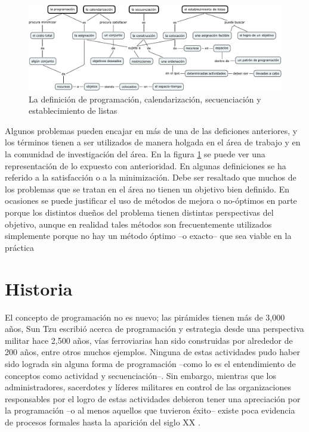 \documentclass[spanish,draft,12pt,headsepline,footsepline,paper=letter]{scrreprt}
\begin{document}
\begin{figure}[hbtp]
\includegraphics[width=\textwidth]{media/definiciones.pdf}
\caption[Definiciones]{La definición de programación, calendarización, secuenciación y establecimiento de listas}
\label{fig:definitions}
\end{figure}

Algunos problemas pueden encajar en más de una de las deficiones anteriores, y los términos tienen a ser utilizados de manera holgada en el área de trabajo y en la comunidad de investigación del área. En la figura \ref{fig:definitions} se puede ver una representación de lo expuesto con anterioridad.
%
En algunas definiciones se ha referido a la satisfacción o a la minimización. Debe ser resaltado que muchos de los problemas que se tratan en el área no tienen un objetivo bien definido. En ocasiones se puede justificar el uso de métodos de mejora o no-óptimos en parte porque los distintos dueños del problema tienen distintas perspectivas del objetivo, aunque en realidad tales métodos son frecuentemente utilizados simplemente porque no hay un método óptimo –o exacto– que sea viable en la práctica \citep[p.~53,~54]{wren95scheduling-timetabling}

\section{Historia}
\label{historia_programacion}

El concepto de programación no es nuevo; las pirámides tienen más de 3,000 años, Sun Tzu escribió acerca de programación y estrategia desde una perspectiva militar hace 2,500 años, vías ferroviarias han sido construidas por alrededor de 200 años, entre otros muchos ejemplos. Ninguna de estas actividades pudo haber sido lograda sin alguna forma de programación –como lo es el entendimiento de conceptos como actividad y secuenciación–. Sin embargo, mientras que los administradores, sacerdotes y líderes militares en control de las organizaciones responsables por el logro de estas actividades debieron tener una apreciación por la programación –o al menos aquellos que tuvieron éxito– existe poca evidencia de procesos formales hasta la aparición del siglo XX \citep[p.~2]{Weaver2006}.
\end{document}
